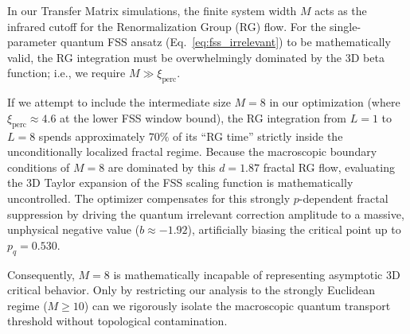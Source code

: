 In our Transfer Matrix simulations, the finite system width $M$ acts as the infrared cutoff for the Renormalization Group (RG) flow. For the single-parameter quantum FSS ansatz (Eq.~\ref{eq:fss_irrelevant}) to be mathematically valid, the RG integration must be overwhelmingly dominated by the 3D beta function; i.e., we require $M \gg \xi_{\text{perc}}$.

If we attempt to include the intermediate size $M=8$ in our optimization (where $\xi_{\text{perc}} \approx 4.6$ at the lower FSS window bound), the RG integration from $L=1$ to $L=8$ spends approximately $70\%$ of its ``RG time'' strictly inside the unconditionally localized fractal regime. Because the macroscopic boundary conditions of $M=8$ are dominated by this $d=1.87$ fractal RG flow, evaluating the 3D Taylor expansion of the FSS scaling function is mathematically uncontrolled. The optimizer compensates for this strongly $p$-dependent fractal suppression by driving the quantum irrelevant correction amplitude to a massive, unphysical negative value ($b \approx -1.92$), artificially biasing the critical point up to $p_q = 0.530$.

Consequently, $M=8$ is mathematically incapable of representing asymptotic 3D critical behavior. Only by restricting our analysis to the strongly Euclidean regime ($M \ge 10$) can we rigorously isolate the macroscopic quantum transport threshold without topological contamination.

